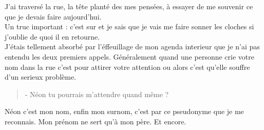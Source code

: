 J'ai traversé la rue, la tête planté des mes pensées, à essayer de me souvenir ce que je devais faire aujourd'hui. \\
Un truc important : c'est sur et je sais que je vais me faire sonner les cloches si j'oublie de quoi il en retourne. \\

J'étais tellement absorbé par l'éffeuillage de mon agenda interieur que je n'ai pas entendu les deux premiers appels. Généralement quand une personne crie votre nom dans la rue c'est pour attirer votre attention ou alors c'est qu'elle souffre d'un serieux problème. \\

\begin{quote}
- Néon tu pourrais m'attendre quand même ? \\
\end{quote}

Néon c'est mon nom, enfin mon surnom, c'est par ce pseudonyme que je me reconnais. Mon prénom ne sert qu'à mon père. Et encore. \\